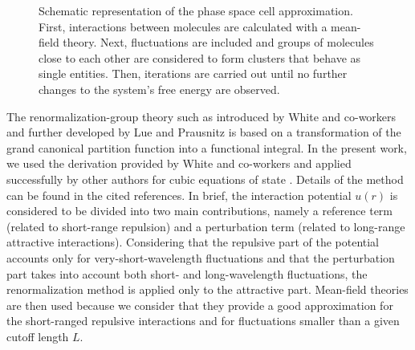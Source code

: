 \documentclass[preprint,12pt,3p]{elsarticle}
\begin{document}
\begin{figure}[!ht]
\centering
\captionsetup{justification=centering}
\caption{Schematic representation of the phase space cell approximation. First, interactions between molecules are calculated with a mean-field theory. Next, fluctuations are included and groups of molecules close to each other are considered to form clusters that behave as single entities. Then, iterations are carried out until no further changes to the system's free energy are observed.}
\label{fig:schematics}
\end{figure}

The renormalization-group theory such as introduced by White and co-workers \cite{white1993renormalization,white1995renormalization,white1998renormalization} and further developed by Lue and Prausnitz \cite{lue1998renormalization, lue1998brenormalization} is based on a transformation of the grand canonical partition function into a functional integral.
In the present work, we used the derivation provided by White and co-workers \cite{white1993renormalization,white1995renormalization,white1998renormalization} and applied successfully by other authors for cubic equations of state \cite{cai2006vapor,pcm2017application,xu2010crossover,xu2011prediction}. Details of the method can be found in the cited references.
In brief, the interaction potential $u(r)$ is considered to be divided into two main contributions, namely a reference term (related to short-range repulsion) and a perturbation term (related to long-range attractive interactions).
Considering that the repulsive part of the potential accounts only for very-short-wavelength fluctuations and that the perturbation part takes into account both short- and long-wavelength fluctuations, the renormalization method is applied only to the attractive part.
Mean-field theories are then used because we consider that they provide a good approximation for the short-ranged repulsive interactions and for fluctuations smaller than a given cutoff length $L$.
\end{document}
